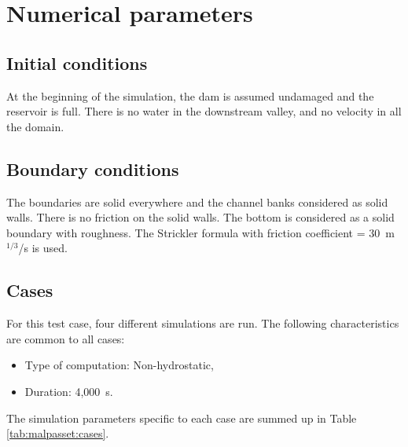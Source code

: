 \section{Numerical parameters}

\subsection{Initial conditions}
At the beginning of the simulation, the dam is assumed undamaged and the reservoir is full. There is no water in the downstream valley, and no velocity in all the domain.
\subsection{Boundary conditions}
The boundaries are solid everywhere and the channel banks considered as solid walls. There is no friction on the solid walls. The bottom is considered as a solid boundary with roughness. The Strickler formula with friction coefficient = 30~m$^{1/3}$/s is used.

\subsection{Cases}
For this test case, four different simulations are run. The following characteristics are common to all cases:\\
\begin{itemize}
\itemsep0em
\item Type of computation: Non-hydrostatic,
\item Duration: 4,000~s.
\end{itemize}

The simulation parameters specific to each case are summed up in Table \ref{tab:malpasset:cases}.
\begin{table}[H]
  \caption{List of the simulation parameters used for the four cases tested in the Malpasset example.}
  \label{tab:malpasset:cases}
\end{table}

